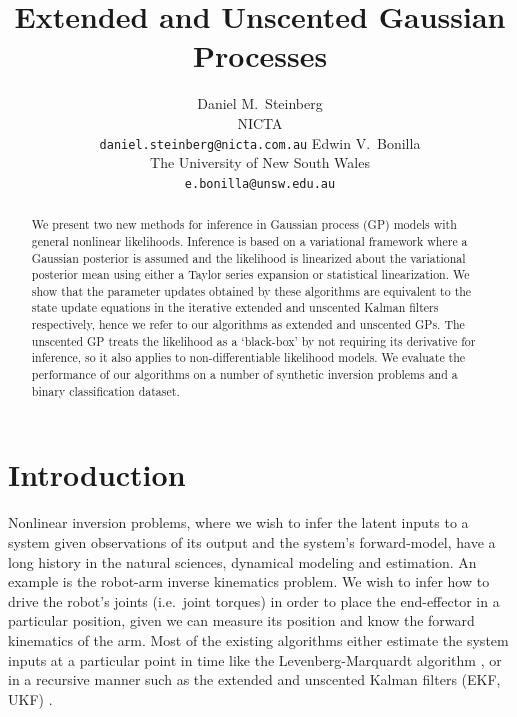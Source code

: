 \documentclass{article} %
\title{Extended and Unscented Gaussian Processes}
\author{
    Daniel M.~Steinberg \\
    NICTA \\ 
 \texttt{daniel.steinberg@nicta.com.au} 
\And
Edwin V.~Bonilla \\
The University of New South Wales \\
 \texttt{e.bonilla@unsw.edu.au} 
}
\begin{document}
\maketitle

\begin{abstract}

    We present two new methods for inference in Gaussian process (GP) models
    with general nonlinear likelihoods. Inference is based on a variational
    framework where a Gaussian posterior is assumed and the likelihood is
    linearized about the variational posterior mean using either a %
    Taylor series expansion or statistical linearization. We show that the
    parameter updates obtained by these algorithms are equivalent to the state
    update equations in the iterative extended and unscented Kalman filters
    respectively, hence we refer to our algorithms as extended and unscented
    GPs. The unscented GP treats the likelihood as a `black-box' by not
    requiring its derivative for inference, so it also applies to
    non-differentiable likelihood models. We evaluate the performance of our
    algorithms on a  number of synthetic inversion problems and a binary
    classification dataset.
    
\end{abstract}


\section{Introduction}

Nonlinear inversion problems, where we wish to infer the latent inputs to a
system given observations of its output and the system's forward-model, have a
long history in the natural sciences, dynamical modeling and estimation. An
example is the robot-arm inverse kinematics problem. We wish to infer how to
drive the robot's joints (i.e.~joint torques) in order to place the
end-effector in a particular position, given we can measure its position and
know the forward kinematics of the arm. Most of the existing algorithms either
estimate the system inputs at a particular point in time like the
Levenberg-Marquardt algorithm \cite{Marquardt1963}, or in a recursive manner
such as the extended and unscented Kalman filters (EKF, UKF) \cite{Julier2004}. 
\end{document}
